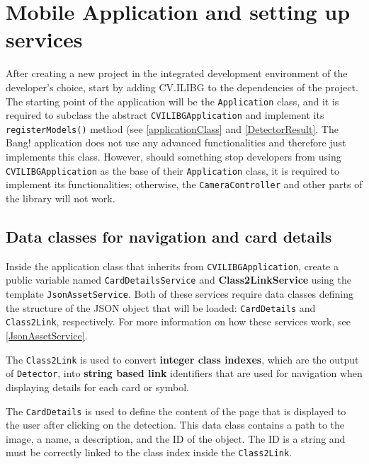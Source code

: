 

\section{Mobile Application and setting up services}
After creating a new project in the integrated development environment of the developer's choice, start by adding CV.ILIBG to the dependencies of the project. The starting point of the application will be the \texttt{Application} class, and it is required to subclass the abstract \texttt{CVILIBGApplication} and implement its \texttt{registerModels()} method (see \ref{applicationClass} and \ref{DetectorResult}. The Bang! application does not use any advanced functionalities and therefore just implements this class. However, should something stop developers from using \texttt{CVILIBGApplication} as the base of their \texttt{Application} class, it is required to implement its functionalities; otherwise, the \texttt{CameraController} and other parts of the library will not work.

\subsection{Data classes for navigation and card details}
Inside the application class that inherits from \texttt{CVILIBGApplication}, create a public variable named \texttt{CardDetailsService} and \textbf{Class2LinkService} using the template \texttt{JsonAssetService}. Both of these services require data classes defining the structure of the JSON object that will be loaded: \texttt{CardDetails} and \texttt{Class2Link}, respectively. For more information on how these services work, see \ref{JsonAssetService}.

The \texttt{Class2Link} is used to convert \textbf{integer class indexes}, which are the output of \texttt{Detector}, into \textbf{string based link} identifiers that are used for navigation when displaying details for each card or symbol.

The \texttt{CardDetails} is used to define the content of the page that is displayed to the user after clicking on the detection. This data class contains a path to the image, a name, a description, and the ID of the object. The ID is a string and must be correctly linked to the class index inside the \texttt{Class2Link}.

